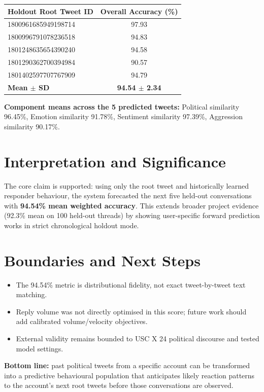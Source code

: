 \documentclass[10pt]{article}
\begin{document}
\begin{center}
\begin{tabular}{l c}
\toprule
Holdout Root Tweet ID & Overall Accuracy (\%) \\
\midrule
1800961685949198714 & 97.93 \\
1800996791078236518 & 94.83 \\
1801248635654390240 & 94.58 \\
1801290362700394984 & 90.57 \\
1801402597707767909 & 94.79 \\
\midrule
\textbf{Mean $\pm$ SD} & \textbf{94.54 $\pm$ 2.34} \\
\bottomrule
\end{tabular}
\end{center}

\textbf{Component means across the 5 predicted tweets:}
Political similarity 96.45\%, Emotion similarity 91.78\%, Sentiment similarity 97.39\%, Aggression similarity 90.17\%.

\section{Interpretation and Significance}
The core claim is supported: using only the root tweet and historically learned responder behaviour, the system forecasted the next five held-out conversations with \textbf{94.54\% mean weighted accuracy}. This extends broader project evidence (92.3\% mean on 100 held-out threads) by showing user-specific forward prediction works in strict chronological holdout mode.

\section{Boundaries and Next Steps}
\begin{itemize}
  \item The 94.54\% metric is distributional fidelity, not exact tweet-by-tweet text matching.
  \item Reply volume was not directly optimised in this score; future work should add calibrated volume/velocity objectives.
  \item External validity remains bounded to USC X 24 political discourse and tested model settings.
\end{itemize}

\vspace{0.25em}
\textbf{Bottom line:} past political tweets from a specific account can be transformed into a predictive behavioural population that anticipates likely reaction patterns to the account's next root tweets before those conversations are observed.
\end{document}
